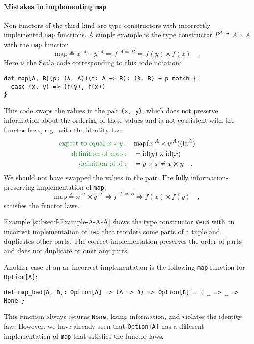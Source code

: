 \paragraph{Mistakes in implementing \lstinline!map!}

Non-functors of the third kind are type constructors with incorrectly
implemented \lstinline!map! functions. A simple example is the type
constructor $P^{A}\triangleq A\times A$ with the \lstinline!map!
function
\[
\text{map}\triangleq x^{:A}\times y^{:A}\Rightarrow f^{:A\Rightarrow B}\Rightarrow f(y)\times f(x)\quad.
\]
Here is the Scala code corresponding to this code notation:
\begin{lstlisting}
def map[A, B](p: (A, A))(f: A => B): (B, B) = p match {
  case (x, y) => (f(y), f(x))
}
\end{lstlisting}
This code swaps the values in the pair \lstinline!(x, y)!, which
does not preserve information about the ordering of these values and
is not consistent with the functor laws, e.g.~with the identity law:
\begin{align*}
{\color{greenunder}\text{expect to equal }x\times y:}\quad & \text{map}(x^{:A}\times y^{:A})(\text{id}^{A})\\
{\color{greenunder}\text{definition of }\text{map}:}\quad & =\text{id}(y)\times\text{id}(x)\\
{\color{greenunder}\text{definition of }\text{id}:}\quad & =y\times x\neq x\times y\quad.
\end{align*}
We should not have swapped the values in the pair. The fully information-preserving
implementation of \lstinline!map!,
\[
\text{map}\triangleq x^{:A}\times y^{:A}\Rightarrow f^{:A\Rightarrow B}\Rightarrow f(x)\times f(y)\quad,
\]
satisfies the functor laws.

Example \ref{subsec:f-Example-A-A-A} shows the type constructor \lstinline!Vec3!
with an incorrect implementation of \lstinline!map! that reorders
some parts of a tuple and duplicates other parts. The correct implementation
preserves the order of parts and does not duplicate or omit any parts.

Another case of an an incorrect implementation is the following \lstinline!map!
function for \lstinline!Option[A]!:
\begin{lstlisting}
def map_bad[A, B]: Option[A] => (A => B) => Option[B] = { _ => _ => None }
\end{lstlisting}
This function always returns \lstinline!None!, losing information,
and violates the identity law. However, we have already seen that
\lstinline!Option[A]! has a different implementation of \lstinline!map!
that satisfies the functor laws.

